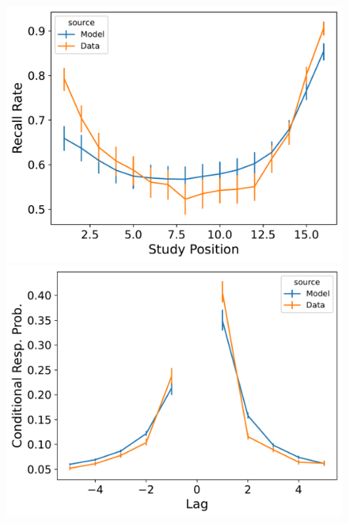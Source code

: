 \documentclass[
  letterpaper,
  11pt,
  english,
  singlespacing,
  headsepline]{MastersDoctoralThesis}
\begin{document}
\begin{figure}
\begin{minipage}{0.33\linewidth}
\includegraphics{icmr_figures/HealyKahana2014_TraceScalingCMR_Model_Fitting_spc-1.png}\end{minipage}%
\newline
\begin{minipage}{0.33\linewidth}
\includegraphics{icmr_figures/HealyKahana2014_MultiScalingCMR_Model_Fitting_crp-1.png}\end{minipage}%
%
\begin{minipage}{0.33\linewidth}

\end{minipage}
\end{figure}
\end{document}
